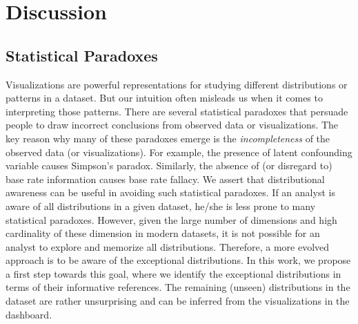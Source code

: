 \section{Discussion}
\subsection{Statistical Paradoxes}
Visualizations are powerful representations for studying different distributions or patterns in a dataset. But our intuition often misleads us when it comes to interpreting those patterns. There are several statistical paradoxes that persuade people to draw incorrect conclusions from observed data or visualizations. The key reason why many of these paradoxes emerge is the \emph{incompleteness} of the observed data (or visualizations). For example, the presence of latent confounding variable causes Simpson's paradox. Similarly, the absence of (or disregard to) base rate information causes base rate fallacy. We assert  that distributional awareness can be useful in avoiding such statistical paradoxes. If an analyst is aware of all distributions in a given dataset, he/she is less prone to many statistical paradoxes. However, given the large number of dimensions and high cardinality of these dimension in modern datasets, it is not possible for an analyst to explore and memorize all distributions. Therefore, a more evolved approach is to be aware of the exceptional distributions. In this work, we propose a first step towards this goal, where we identify the exceptional distributions in terms of their informative references. The remaining (unseen) distributions in the dataset are rather unsurprising and can be inferred from the visualizations in the dashboard. 

